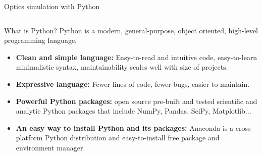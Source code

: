 \documentclass[serif ,mathserif, 8pt]{beamer}
\begin{document}
\begin{frame}{Optics simulation with Python}
\begin{columns}[c]
	\begin{column}{0.6\textwidth}
		\begin{block}{What is Python?}
			Python is a modern, general-purpose, object oriented, high-level programming language.
			\begin{itemize}
				\item \textbf{Clean and simple language:} Easy-to-read and intuitive code, easy-to-learn minimalistic syntax, maintainability scales well with size of projects.
				\item \textbf{Expressive language:} Fewer lines of code, fewer bugs, easier to maintain.
				\item \textbf{Powerful Python packages:} open source pre-built and tested scientific and
				analytic Python packages that include NumPy, Pandas, SciPy, Matplotlib...
				\item \textbf{An easy way to install Python and its packages:} Anaconda is a cross platform Python distribution and easy-to-install free package and environment manager.
			\end{itemize}
		\end{block}
		
	\end{column}
	

\end{columns}
\end{frame}
\end{document}
